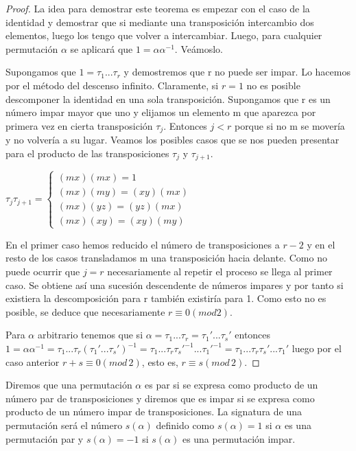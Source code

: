 \begin{proof}
La idea para demostrar este teorema es empezar con el caso de la identidad y demostrar que si mediante una transposición intercambio dos elementos, luego los tengo que volver a intercambiar. Luego, para cualquier permutación $\alpha$ se aplicará que $1 = \alpha\alpha^{-1}$. Veámoslo.

Supongamos que $1 = \tau_1...\tau_r$ y demostremos que r no puede ser impar. Lo hacemos por el método del descenso infinito. Claramente, si $r = 1$ no es posible descomponer la identidad en una sola transposición. Supongamos que r es un número impar mayor que uno y elijamos un elemento m que aparezca por primera vez en cierta transposición $\tau_j$. Entonces $j < r$ porque si no m se movería y no volvería a su lugar. Veamos los posibles casos que se nos pueden presentar para el producto de las transposiciones $\tau_j$ y $\tau_{j+1}$.

$\tau_j\tau_{j+1}=
\begin{cases}
(mx)(mx) = 1 \\
(mx)(my) = (xy)(mx) \\
(mx)(yz) = (yz)(mx) \\
(mx)(xy) = (xy)(my)
\end{cases}$

En el primer caso hemos reducido el número de transposiciones a $r-2$ y en el resto de los casos transladamos m una transposición hacia delante. Como no puede ocurrir que $j = r$ necesariamente al repetir el proceso se llega al primer caso. Se obtiene así una sucesión descendente de números impares y por tanto si existiera la descomposición para r también existiría para 1. Como esto no es posible, se deduce que necesariamente $r \equiv 0 (mod 2)$.

Para $\alpha$ arbitrario tenemos que si $\alpha = \tau_1...\tau_r = \tau_1'...\tau_s'$ entonces $1 = \alpha\alpha^{-1} = \tau_1...\tau_r(\tau_1'...\tau_s')^{-1} = \tau_1...\tau_r\tau_s'^{-1}...\tau_1'^{-1} = \tau_1...\tau_r\tau_s'...\tau_1'$ luego por el caso anterior $r+s \equiv 0 (mod \, 2)$, esto es, $r \equiv s (mod \, 2)$.
\end{proof}

\begin{definition}
Diremos que una permutación $\alpha$ es par si se expresa como producto de un número par de transposiciones y diremos que es impar si se expresa como producto de un número impar de transposiciones. La signatura de una permutación será el número $s(\alpha)$ definido como $s(\alpha) = 1$ si $\alpha$ es una permutación par y $s(\alpha) = -1$ si $s(\alpha)$ es una permutación impar.
\end{definition}

